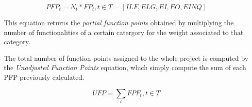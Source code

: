 \begin{displaymath}
	PFP_t = N_t * FP_t, t \in T = {[ILF, ELG, EI, EO, EINQ]}
\end{displaymath}

This equation returns the \textit{partial function points} obtained by multiplying the number of functionalities of a certain catergory for the weight associated to that category.

The total number of function points assigned to the whole project is computed by the \textit{Unadjusted Function Points} equation, which
simply compute the sum of each PFP previously calculated.

\begin{displaymath}
	UFP = \sum_{t} FPF_t, t \in T
\end{displaymath}


